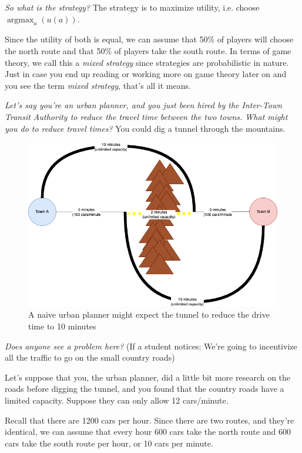 \documentclass[11pt]{article}
\begin{document}
{\it So what is the strategy?} The strategy is to maximize utility, i.e. choose $\operatorname*{argmax}_a (u(a))$.

Since the utility of both is equal, we can assume that 50\% of players will choose the north route and that 50\% of players take the south route. In terms of game theory, we call this a {\it mixed strategy} since strategies are probabilistic in nature. Just in case you end up reading or working more on game theory later on and you see the term {\it mixed strategy}, that's all it means.


{\it Let's say you're an urban planner, and you just been hired by the Inter-Town Transit Authority to reduce the travel time between the two towns. What might you do to reduce travel times?} You could dig a tunnel through the mountains.

\begin{figure}
    \centering
    \includegraphics[width=5in]{braess_2.png}
    \caption{A naive urban planner might expect the tunnel to reduce the drive time to 10 minutes}
\end{figure}

{\it Does anyone see a problem here?} (If a student notices: We're going to incentivize all the traffic to go on the small country roads)

Let's suppose that you, the urban planner, did a little bit more research on the roads before digging the tunnel, and you found that the country roads have a limited capacity. Suppose they can only allow 12 cars/minute. 

Recall that there are 1200 cars per hour. Since there are two routes, and they're identical, we can assume that every hour 600 cars take the north route and 600 cars take the south route per hour, or 10 cars per minute. 
\end{document}
